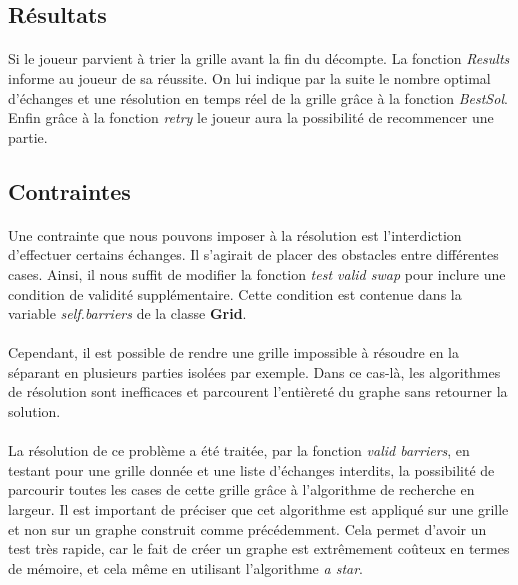 \documentclass[12pt]{article}
\begin{document}
\subsection{Résultats}
\paragraph{}
Si le joueur parvient à trier la grille avant la fin du décompte. La fonction \textit{Results} informe au joueur de sa réussite. On lui indique par la suite le nombre optimal d'échanges et une résolution en temps réel de la grille grâce à la fonction \textit{BestSol}. Enfin grâce à la fonction \textit{retry} le joueur aura la possibilité de recommencer une partie.



\subsection{Contraintes}
\paragraph{}
Une contrainte que nous pouvons imposer à la résolution est l'interdiction d'effectuer certains échanges. Il s'agirait de placer des obstacles entre différentes cases. Ainsi, il nous suffit de modifier la fonction \textit{test valid swap} pour inclure une condition de validité supplémentaire. Cette condition est contenue dans la variable \textit{self.barriers} de la classe \textbf{Grid}. 

\paragraph{}
Cependant, il est possible de rendre une grille impossible à résoudre en la séparant en plusieurs parties isolées par exemple. Dans ce cas-là, les algorithmes de résolution sont inefficaces et parcourent l'entièreté du graphe sans retourner la solution.

\paragraph{}
La résolution de ce problème a été traitée, par la fonction \textit{valid barriers}, en testant pour une grille donnée et une liste d'échanges interdits, la possibilité de parcourir toutes les cases de cette grille grâce à l'algorithme de recherche en largeur. Il est important de préciser que cet algorithme est appliqué sur une grille et non sur un graphe construit comme précédemment. Cela permet d'avoir un test très rapide, car le fait de créer un graphe est extrêmement coûteux en termes de mémoire, et cela même en utilisant l'algorithme \textit{a star}.
\end{document}
